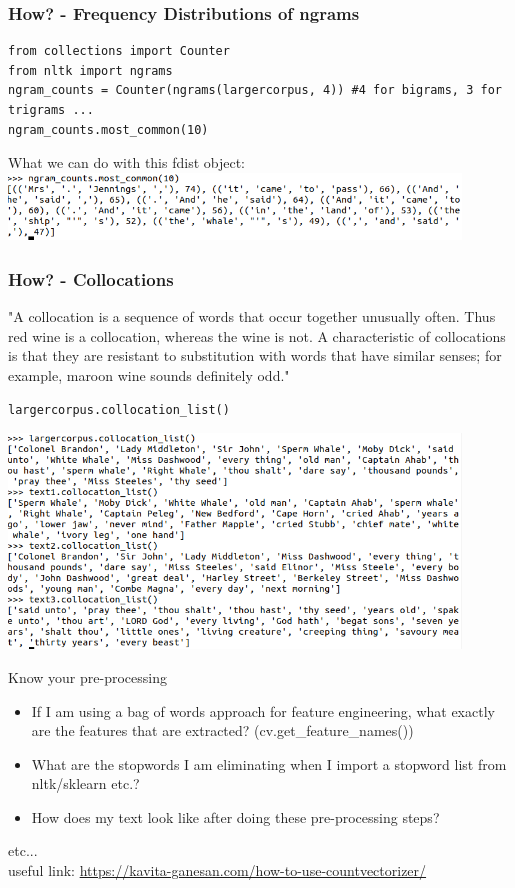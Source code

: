 \documentclass{beamer}
\begin{document}
\begin{frame}[fragile]
\frametitle{How? - Frequency Distributions of ngrams}
\tiny
\begin{verbatim}
from collections import Counter
from nltk import ngrams
ngram_counts = Counter(ngrams(largercorpus, 4)) #4 for bigrams, 3 for trigrams ...
ngram_counts.most_common(10)
\end{verbatim}

What we can do with this fdist object:
\includegraphics[width=0.9\textwidth]{figures/ngramcounts.png}
\end{frame}

\begin{frame}[fragile]
\frametitle{How? - Collocations}
"A collocation is a sequence of words that occur together unusually often. Thus red wine is a collocation, whereas the wine is not. A characteristic of collocations is that they are resistant to substitution with words that have similar senses; for example, maroon wine sounds definitely odd." 
\begin{verbatim}
largercorpus.collocation_list()
\end{verbatim}

\includegraphics[width=0.9\textwidth]{figures/collocations.png}

\end{frame}

\begin{frame}{Know your pre-processing}
\begin{itemize}
\item If I am using a bag of words approach for feature engineering, what exactly are the features that are extracted? (cv.get\_feature\_names())
\item What are the stopwords I am eliminating when I import a stopword list from nltk/sklearn etc.?
\item How does my text look like after doing these pre-processing steps?
\end{itemize}
etc... \\
\tiny useful link: \url{https://kavita-ganesan.com/how-to-use-countvectorizer/}
\end{frame}
\end{document}
